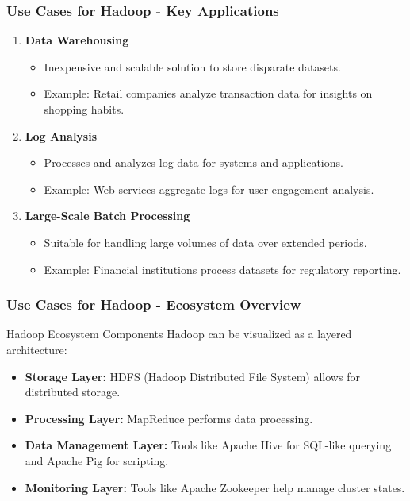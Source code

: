 \documentclass{beamer}
\begin{document}
\begin{frame}[fragile]
    \frametitle{Use Cases for Hadoop - Key Applications}
    \begin{enumerate}
        \item \textbf{Data Warehousing}
        \begin{itemize}
            \item Inexpensive and scalable solution to store disparate datasets.
            \item Example: Retail companies analyze transaction data for insights on shopping habits.
        \end{itemize}
    
        \item \textbf{Log Analysis}
        \begin{itemize}
            \item Processes and analyzes log data for systems and applications.
            \item Example: Web services aggregate logs for user engagement analysis.
        \end{itemize}
        
        \item \textbf{Large-Scale Batch Processing}
        \begin{itemize}
            \item Suitable for handling large volumes of data over extended periods.
            \item Example: Financial institutions process datasets for regulatory reporting.
        \end{itemize}
    \end{enumerate}
\end{frame}

\begin{frame}[fragile]
    \frametitle{Use Cases for Hadoop - Ecosystem Overview}
    \begin{block}{Hadoop Ecosystem Components}
        Hadoop can be visualized as a layered architecture:
        \begin{itemize}
            \item \textbf{Storage Layer:} HDFS (Hadoop Distributed File System) allows for distributed storage.
            \item \textbf{Processing Layer:} MapReduce performs data processing.
            \item \textbf{Data Management Layer:} Tools like Apache Hive for SQL-like querying and Apache Pig for scripting.
            \item \textbf{Monitoring Layer:} Tools like Apache Zookeeper help manage cluster states.
        \end{itemize}
    \end{block}
\end{frame}
\end{document}
